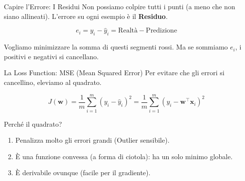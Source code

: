 \documentclass[aspectratio=169, 10pt]{beamer}
\begin{document}
\begin{frame}{Capire l'Errore: I Residui}
    Non possiamo colpire tutti i punti (a meno che non siano allineati). L'errore su ogni esempio è il \textbf{Residuo}.
    
    \[ e_i = y_i - \hat{y}_i = \text{Realtà} - \text{Predizione} \]
    
    \centering
    
    \small Vogliamo minimizzare la somma di questi segmenti rossi. Ma se sommiamo $e_i$, i positivi e negativi si cancellano.
\end{frame}

\begin{frame}{La Loss Function: MSE (Mean Squared Error)}
    Per evitare che gli errori si cancellino, eleviamo al quadrato.
    
    \[ J(\mathbf{w}) = \frac{1}{m} \sum_{i=1}^m (y_i - \hat{y}_i)^2 = \frac{1}{m} \sum_{i=1}^m (y_i - \mathbf{w}^\top \mathbf{x}_i)^2 \]
    
    \begin{alertblock}{Perché il quadrato?}
        \begin{enumerate}
            \item Penalizza molto gli errori grandi (Outlier sensibile).
            \item È una funzione convessa (a forma di ciotola): ha un solo minimo globale.
            \item È derivabile ovunque (facile per il gradiente).
        \end{enumerate}
    \end{alertblock}
\end{frame}
\end{document}
